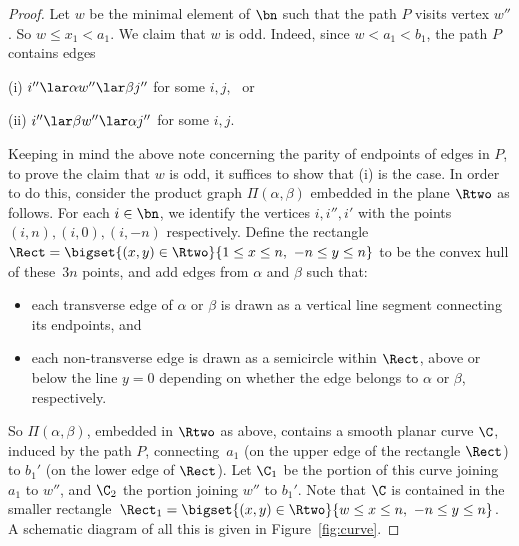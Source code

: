 \begin{proof}
%
Let $w$ be the minimal element of $\bn$ such that the path $P$ visits vertex $w''$.  So $w\leq x_1<a_1$.  We claim that $w$ is odd.  Indeed, since $w<a_1<b_1$, the path $P$ contains edges
\begin{itemize}\begin{multicols}{2}
\item[(i)] $i''\lar\alpha w''\lar\beta j''$ for some $i,j$, \ or
\item[(ii)] $i''\lar\beta w''\lar\alpha j''$ for some $i,j$.
\end{multicols}\end{itemize}
Keeping in mind the above note concerning the parity of endpoints of edges in $P$, to prove the claim that $w$ is odd, it suffices to show that (i) is the case.
%
In order to do this, consider the product graph $\Pi(\alpha,\beta)$ embedded in the plane $\Rtwo$ as follows.  For each $i\in\bn$, we identify the vertices $i,i'',i'$ with the points $(i,n),(i,0),(i,-n)$ respectively.  Define the rectangle $\Rect=\bigset{(x,y)\in\Rtwo}{1\leq x\leq n,\ -n\leq y\leq n}$ to be the convex hull of these~$3n$ points, and add edges from $\alpha$ and $\beta$ such that:
\begin{itemize}
\item each transverse edge of $\alpha$ or $\beta$ is drawn as a vertical line segment connecting its endpoints, and
\item each non-transverse edge is drawn as a semicircle within $\Rect$, above or below the line $y=0$ depending on whether the edge belongs to $\alpha$ or $\beta$, respectively.
\end{itemize}
So $\Pi(\alpha,\beta)$, embedded in $\Rtwo$ as above, contains a smooth planar curve $\C$, induced by the path $P$, connecting~$a_1$ (on the upper edge of the rectangle $\Rect$) to $b_1'$ (on the lower edge of $\Rect$).  Let $\C_1$ be the portion of this curve joining $a_1$ to $w''$, and $\C_2$ the portion joining $w''$ to $b_1'$.  Note that $\C$ is contained in the smaller rectangle~${\Rect_1=\bigset{(x,y)\in\Rtwo}{w\leq x\leq n,\ -n\leq y\leq n}}$.  A schematic diagram of all this is given in Figure~\ref{fig:curve}.


\end{proof}
